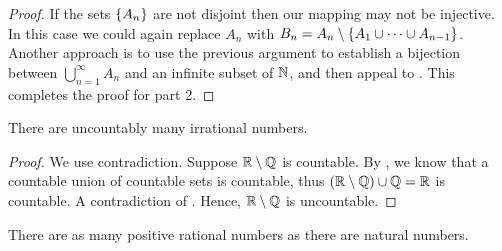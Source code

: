 \documentclass[11pt,twoside=off,numbers=noenddot]{scrbook}
\begin{document}
\begin{proof}
  If the sets $\{ A_n \}$ are not disjoint then our mapping may not
  be injective. In this case we could again replace $A_n$ with $B_n =
  A_n \setminus \{ A_1 \cup \dots \cup A_{n - 1} \}$. Another
  approach is to use the previous argument to establish a bijection
  between $\bigcup_{n = 1}^{\infty} A_n$ and an infinite subset of
  $\mathbb N$, and then appeal to .
  This completes the proof for part 2.
\end{proof}

\begin{theorem}
  There are uncountably many irrational numbers.
\end{theorem}

\begin{proof}
  We use contradiction. Suppose $\mathbb R \setminus \mathbb Q$ is countable. By
  , we know that a countable union
  of countable sets is countable, thus $(\mathbb R \setminus \mathbb Q) \cup \mathbb Q
  = \mathbb R$ is countable. A contradiction of .
  Hence, $\mathbb R \setminus \mathbb Q$ is uncountable.
\end{proof}

\begin{theorem}[$\size{\QQ_+} = \size{\NN}$]
  There are as many positive rational numbers as there are natural numbers.
\end{theorem}
\end{document}

